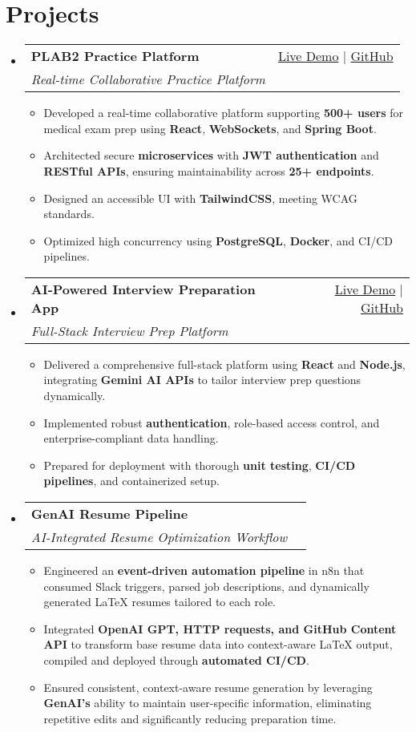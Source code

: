 \documentclass[letterpaper,11pt]{article}
\makeatletter
\newcommand{\resumeItem}[1]{\item\small{#1 \vspace{-2pt}}}
\newcommand{\resumeSubheading}[4]{
  \vspace{-1pt}\item
    \begin{tabular*}{0.97\textwidth}[t]{l@{\extracolsep{\fill}}r}
      \textbf{#1} & #2 \\
      \textit{\small#3} & \textit{\small #4} \\
    \end{tabular*}\vspace{-5pt}
}
\newcommand{\resumeSubHeadingListStart}{\begin{itemize}[leftmargin=*]}
\newcommand{\resumeSubHeadingListEnd}{\end{itemize}}
\newcommand{\resumeItemListStart}{\begin{itemize}}
\newcommand{\resumeItemListEnd}{\end{itemize}\vspace{-5pt}}
\makeatother
\begin{document}
\section{Projects}
  \resumeSubHeadingListStart
    \resumeSubheading
      {\textbf{PLAB2 Practice Platform}}{\href{https://plab2practice.com}{Live Demo} | \href{https://github.com/altansaid/plab2projectnew}{GitHub}}
      {Real-time Collaborative Practice Platform}{}
      \resumeItemListStart
        \resumeItem{Developed a real-time collaborative platform supporting \textbf{500+ users} for medical exam prep using \textbf{React}, \textbf{WebSockets}, and \textbf{Spring Boot}.}
        \resumeItem{Architected secure \textbf{microservices} with \textbf{JWT authentication} and \textbf{RESTful APIs}, ensuring maintainability across \textbf{25+ endpoints}.}
        \resumeItem{Designed an accessible UI with \textbf{TailwindCSS}, meeting WCAG standards.}
        \resumeItem{Optimized high concurrency using \textbf{PostgreSQL}, \textbf{Docker}, and CI/CD pipelines.}
      \resumeItemListEnd

    \resumeSubheading
      {\textbf{AI-Powered Interview Preparation App}}{\href{https://interviewcoach-ai.vercel.app}{Live Demo} | \href{https://github.com/altansaid/interviewcoach-ai}{GitHub}}
      {Full-Stack Interview Prep Platform}{}
      \resumeItemListStart
        \resumeItem{Delivered a comprehensive full-stack platform using \textbf{React} and \textbf{Node.js}, integrating \textbf{Gemini AI APIs} to tailor interview prep questions dynamically.}
        \resumeItem{Implemented robust \textbf{authentication}, role-based access control, and enterprise-compliant data handling.}
        \resumeItem{Prepared for deployment with thorough \textbf{unit testing}, \textbf{CI/CD pipelines}, and containerized setup.}
      \resumeItemListEnd

        \resumeSubheading
  {\textbf{GenAI Resume Pipeline}}{}{AI-Integrated Resume Optimization Workflow}{}
  \resumeItemListStart
   \resumeItem{Engineered an \textbf{event-driven automation pipeline} in n8n that consumed Slack triggers, parsed job descriptions, and dynamically generated LaTeX resumes tailored to each role.}
\resumeItem{Integrated \textbf{OpenAI GPT, HTTP requests, and GitHub Content API} to transform base resume data into context-aware LaTeX output, compiled and deployed through \textbf{automated CI/CD}.}
\resumeItem{Ensured consistent, context-aware resume generation by leveraging \textbf{GenAI’s} ability to maintain user-specific information, eliminating repetitive edits and significantly reducing preparation time.}
  \resumeItemListEnd
  \resumeSubHeadingListEnd
\end{document}
